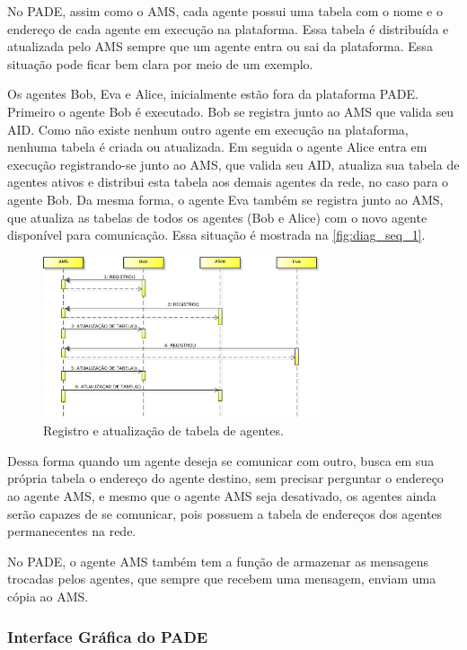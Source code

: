 \documentclass[journal]{IEEEtran}
\begin{document}
No PADE, assim como o AMS, cada agente possui uma tabela com o nome e o endereço de cada agente em execução na plataforma. Essa tabela é distribuída e atualizada pelo AMS sempre que um agente entra ou sai da plataforma. Essa situação pode ficar bem clara por meio de um exemplo.

Os agentes Bob, Eva e Alice, inicialmente estão fora da plataforma PADE. Primeiro o agente Bob é executado. Bob se registra junto ao AMS que valida seu AID. Como não existe nenhum outro agente em execução na plataforma, nenhuma tabela é criada ou atualizada. Em seguida o agente Alice entra em execução registrando-se junto ao AMS, que valida seu AID, atualiza sua tabela de agentes ativos e distribui esta tabela aos demais agentes da rede, no caso para o agente Bob. Da mesma forma, o agente Eva também se registra junto ao AMS, que atualiza as tabelas de todos os agentes (Bob e Alice) com o novo agente disponível para comunicação. Essa situação é mostrada na \autoref{fig:diag_seq_1}.

\begin{figure}[!htb]
    \centering
    \includegraphics[width=3.2in]{Figuras/alice_bob_eva.eps}
    \caption{\label{fig:diag_seq_1}Registro e atualização de tabela de agentes.}
\end{figure}

Dessa forma quando um agente deseja se comunicar com outro, busca em sua própria tabela o endereço do agente destino, sem precisar perguntar o endereço ao agente AMS, e mesmo que o agente AMS seja desativado, os agentes ainda serão capazes de se comunicar, pois possuem a tabela de endereços dos agentes permanecentes na rede.

No PADE, o agente AMS também tem a função de armazenar as mensagens trocadas pelos agentes, que sempre que recebem uma mensagem, enviam uma cópia ao AMS.

\subsubsection{Interface Gráfica do PADE}
\end{document}
